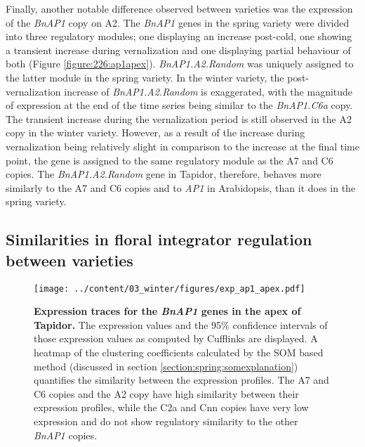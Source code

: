 \documentclass[12pt,]{book}
\begin{document}
Finally, another notable difference observed between varieties was the
expression of the \emph{BnAP1} copy on A2. The \emph{BnAP1} genes in the
spring variety were divided into three regulatory modules; one
displaying an increase post-cold, one showing a transient increase
during vernalization and one displaying partial behaviour of both
(Figure \ref{figure:226:ap1apex}). \emph{BnAP1.A2.Random} was uniquely
assigned to the latter module in the spring variety. In the winter
variety, the post-vernalization increase of \emph{BnAP1.A2.Random} is
exaggerated, with the magnitude of expression at the end of the time
series being similar to the \emph{BnAP1.C6a} copy. The transient
increase during the vernalization period is still observed in the A2
copy in the winter variety. However, as a result of the increase during
vernalization being relatively slight in comparison to the increase at
the final time point, the gene is assigned to the same regulatory module
as the A7 and C6 copies. The \emph{BnAP1.A2.Random} gene in Tapidor,
therefore, behaves more similarly to the A7 and C6 copies and to
\emph{AP1} in Arabidopsis, than it does in the spring variety.

\subsection{Similarities in floral integrator regulation between
varieties}\label{section:winter:floralsimilarities}

\begin{figure}[htbp]
\centering
\texttt{[image: ../content/03\_winter/figures/exp\_ap1\_apex.pdf]}
\caption{\textbf{Expression traces for the \emph{BnAP1} genes in the
apex of Tapidor.} The expression values and the 95\% confidence
intervals of those expression values as computed by Cufflinks are
displayed. A heatmap of the clustering coefficients calculated by the
SOM based method (discussed in section
\ref{section:spring:somexplanation}) quantifies the similarity between
the expression profiles. The A7 and C6 copies and the A2 copy have high
similarity between their expression profiles, while the C2a and Cnn
copies have very low expression and do not show regulatory similarity to
the other \emph{BnAP1} copies.}\label{figure:3xx:ap1apex}
\end{figure}
\end{document}
